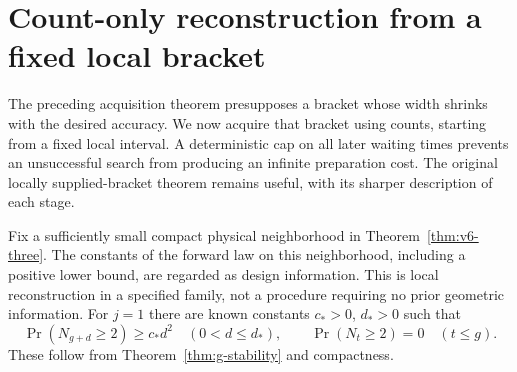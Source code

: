 \section{Count-only reconstruction from a fixed local bracket}
\label{sec:v7-bracket}
The preceding acquisition theorem presupposes a bracket whose width
shrinks with the desired accuracy. We now acquire that bracket using
counts, starting from a fixed local interval. A deterministic cap on
all later waiting times prevents an unsuccessful search from producing
an infinite preparation cost. The original locally supplied-bracket
theorem remains useful, with its sharper description of each stage.

Fix a sufficiently small compact physical neighborhood in
Theorem~\ref{thm:v6-three}. The constants of the forward law on this
neighborhood, including a positive lower bound, are regarded as design
information. This is local reconstruction in a specified family, not
a procedure requiring no prior geometric information. For $j=1$ there
are known constants $c_*>0$, $d_*>0$ such that
\begin{equation}\label{eq:v7-search-onset}
 \Pr(N_{g+d}\ge2)\ge c_*d^2\quad(0<d\le d_*),
 \qquad \Pr(N_t\ge2)=0\quad(t\le g).
\end{equation}
These follow from Theorem~\ref{thm:g-stability} and compactness.

